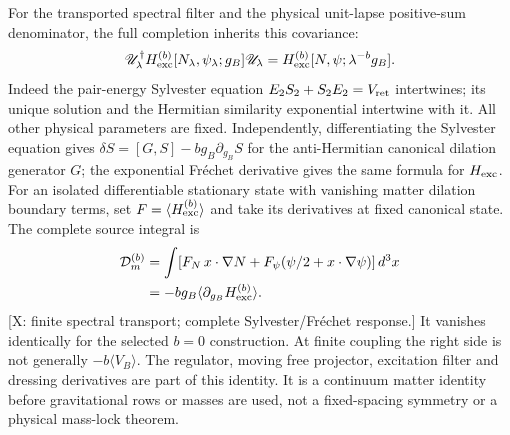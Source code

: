 For the transported spectral filter and the physical unit-lapse
positive-sum denominator, the full completion inherits this covariance:
\[
 \mathscr U_\lambda^\dagger
 H_{\rm exc}^{(b)}[N_\lambda,\psi_\lambda;g_B]\mathscr U_\lambda
   =H_{\rm exc}^{(b)}[N,\psi;\lambda^{-b}g_B].
\]
Indeed the pair-energy Sylvester equation
$E_2S_2+S_2E_2=V_{\rm ret}$ intertwines; its unique solution and
the Hermitian similarity exponential intertwine with it.
All other physical parameters are fixed.
Independently, differentiating the Sylvester equation gives
$\delta S=[G,S]-b g_B\partial_{g_B}S$ for the anti-Hermitian
canonical dilation generator $G$; the exponential Fr\'echet derivative gives the same
formula for $H_{\rm exc}$.
For an isolated differentiable stationary state with vanishing
matter dilation boundary terms, set
$F=\langle H_{\rm exc}^{(b)}\rangle$ and take its derivatives at
fixed canonical state.  The complete source integral is
\[
 \begin{aligned}
 \mathcal D_m^{(b)}
 &=\int [F_N\,x\cdot\nabla N+
            F_\psi(\psi/2+x\cdot\nabla\psi)]\,d^3x\\
 &=-b g_B\langle\partial_{g_B}H_{\rm exc}^{(b)}\rangle .
 \end{aligned}
\]
[X: finite spectral transport; complete Sylvester/Fr\'echet response.]
It vanishes identically for the selected $b=0$ construction.
At finite coupling the right side is not generally
$-b\langle V_B\rangle$.
The regulator, moving free projector, excitation filter and dressing
derivatives are part of this identity.
It is a continuum matter identity before gravitational rows or masses
are used, not a fixed-spacing symmetry or a physical mass-lock theorem.

